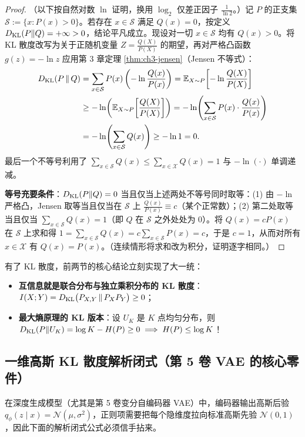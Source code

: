 \begin{proof}
（以下按自然对数 $\ln$ 证明，换用 $\log_2$ 仅差正因子 $\frac{1}{\ln 2}$。）记 $P$ 的正支集 $\mathcal{S} := \{x : P(x) > 0\}$。若存在 $x \in \mathcal{S}$ 满足 $Q(x) = 0$，按定义 $D_{\mathrm{KL}}(P\|Q) = +\infty > 0$，结论平凡成立。现设对一切 $x \in \mathcal{S}$ 均有 $Q(x) > 0$。将 KL 散度改写为关于正随机变量 $Z = \frac{Q(X)}{P(X)}$ 的期望，再对严格凸函数 $g(z) = -\ln z$ 应用第 3 章定理 \ref{thm:ch3-jensen}（Jensen 不等式）：
\begin{align*}
  D_{\mathrm{KL}}(P \,\|\, Q)
  &= \sum_{x \in \mathcal{S}} P(x)\left(-\ln\frac{Q(x)}{P(x)}\right)
   = \mathbb{E}_{X \sim P}\!\left[-\ln\frac{Q(X)}{P(X)}\right] \\
  &\ge -\ln\!\left(\mathbb{E}_{X \sim P}\!\left[\frac{Q(X)}{P(X)}\right]\right)
   = -\ln\!\left(\sum_{x \in \mathcal{S}} P(x)\cdot\frac{Q(x)}{P(x)}\right) \\
  &= -\ln\!\left(\sum_{x \in \mathcal{S}} Q(x)\right)
   \ge -\ln 1 = 0.
\end{align*}
最后一个不等号利用了 $\sum_{x \in \mathcal{S}} Q(x) \le \sum_{x \in \mathcal{X}} Q(x) = 1$ 与 $-\ln(\cdot)$ 单调递减。

\textbf{等号充要条件}：$D_{\mathrm{KL}}(P\|Q) = 0$ 当且仅当上述两处不等号同时取等：(1) 由 $-\ln$ 严格凸，Jensen 取等当且仅当在 $\mathcal{S}$ 上 $\frac{Q(x)}{P(x)} \equiv c$（某个正常数）；(2) 第二处取等当且仅当 $\sum_{x \in \mathcal{S}} Q(x) = 1$（即 $Q$ 在 $\mathcal{S}$ 之外处处为 $0$）。将 $Q(x) = c P(x)$ 在 $\mathcal{S}$ 上求和得 $1 = \sum_{x\in\mathcal{S}} Q(x) = c\sum_{x\in\mathcal{S}} P(x) = c$，于是 $c = 1$，从而对所有 $x \in \mathcal{X}$ 有 $Q(x) = P(x)$。（连续情形将求和改为积分，证明逐字相同。）
\end{proof}

有了 KL 散度，前两节的核心结论立刻实现了大一统：
\begin{itemize}
  \item \textbf{互信息就是联合分布与独立乘积分布的 KL 散度}：$I(X; Y) = D_{\mathrm{KL}}\bigl(P_{X,Y} \,\|\, P_X P_Y\bigr) \ge 0$；
  \item \textbf{最大熵原理的 KL 版本}：设 $U_K$ 是 $K$ 点均匀分布，则 $D_{\mathrm{KL}}(P \| U_K) = \log K - H(P) \ge 0 \implies H(P) \le \log K$！
\end{itemize}

\subsection{一维高斯 KL 散度解析闭式（第 5 卷 VAE 的核心零件）}

在深度生成模型（尤其是第 5 卷变分自编码器 VAE）中，编码器输出高斯后验 $q_\phi(z\mid x) = \mathcal{N}(\mu, \sigma^2)$，正则项需要把每个隐维度拉向标准高斯先验 $\mathcal{N}(0, 1)$，因此下面的解析闭式公式必须信手拈来。

